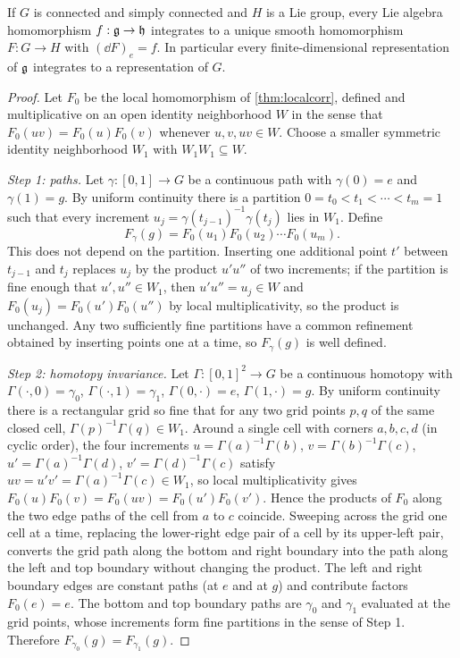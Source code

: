 \begin{theorem}\label{thm:integration}
If $G$ is connected and simply connected and $H$ is a Lie group, every Lie
algebra homomorphism $f:\mathfrak{g}\to\mathfrak{h}$ integrates to a unique smooth homomorphism
$F:G\to H$ with $(\dd F)_e=f$. In particular every finite-dimensional
representation of $\mathfrak{g}$ integrates to a representation of $G$.
\end{theorem}
\begin{proof}
Let $F_0$ be the local homomorphism of \cref{thm:localcorr}, defined and
multiplicative on an open identity neighborhood $W$ in the sense that
$F_0(uv)=F_0(u)F_0(v)$ whenever $u,v,uv\in W$. Choose a smaller symmetric
identity neighborhood $W_1$ with $W_1W_1\subseteq W$.

\emph{Step 1: paths.} Let $\gamma:[0,1]\to G$ be a continuous path with
$\gamma(0)=e$ and $\gamma(1)=g$. By uniform continuity there is a partition
$0=t_0<t_1<\cdots<t_m=1$ such that every increment
$u_j=\gamma(t_{j-1})^{-1}\gamma(t_j)$ lies in $W_1$. Define
\[
 F_\gamma(g)=F_0(u_1)F_0(u_2)\cdots F_0(u_m).
\]
This does not depend on the partition. Inserting one additional point $t'$
between $t_{j-1}$ and $t_j$ replaces $u_j$ by the product $u'u''$ of two
increments; if the partition is fine enough that $u',u''\in W_1$, then
$u'u''=u_j\in W$ and $F_0(u_j)=F_0(u')F_0(u'')$ by local multiplicativity,
so the product is unchanged. Any two sufficiently fine partitions have a
common refinement obtained by inserting points one at a time, so
$F_\gamma(g)$ is well defined.

\emph{Step 2: homotopy invariance.} Let $\Gamma:[0,1]^2\to G$ be a
continuous homotopy with $\Gamma(\cdot,0)=\gamma_0$, $\Gamma(\cdot,1)=\gamma_1$,
$\Gamma(0,\cdot)=e$, $\Gamma(1,\cdot)=g$. By uniform continuity there is a
rectangular grid so fine that for any two grid points $p,q$ of the same
closed cell, $\Gamma(p)^{-1}\Gamma(q)\in W_1$. Around a single cell with
corners $a,b,c,d$ (in cyclic order), the four increments
$u=\Gamma(a)^{-1}\Gamma(b)$, $v=\Gamma(b)^{-1}\Gamma(c)$,
$u'=\Gamma(a)^{-1}\Gamma(d)$, $v'=\Gamma(d)^{-1}\Gamma(c)$ satisfy
$uv=u'v'=\Gamma(a)^{-1}\Gamma(c)\in W_1$, so local multiplicativity gives
$F_0(u)F_0(v)=F_0(uv)=F_0(u')F_0(v')$. Hence the products of $F_0$ along the
two edge paths of the cell from $a$ to $c$ coincide. Sweeping across the
grid one cell at a time, replacing the lower-right edge pair of a cell by
its upper-left pair, converts the grid path along the bottom and right
boundary into the path along the left and top boundary without changing the
product. The left and right boundary edges are constant paths (at $e$ and
at $g$) and contribute factors $F_0(e)=e$. The bottom and top boundary
paths are $\gamma_0$ and $\gamma_1$ evaluated at the grid points, whose
increments form fine partitions in the sense of Step 1. Therefore
$F_{\gamma_0}(g)=F_{\gamma_1}(g)$.


\end{proof}
